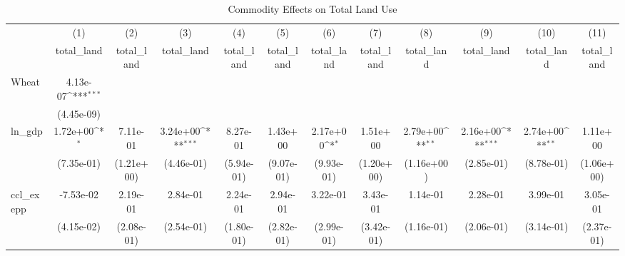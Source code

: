 \begin{table}[htbp]\centering
\def\sym#1{\ifmmode^{#1}\else\(^{#1}\)\fi}
\caption{Commodity Effects on Total Land Use}
\begin{tabular}{l*{11}{c}}
\hline\hline
            &\multicolumn{1}{c}{(1)}&\multicolumn{1}{c}{(2)}&\multicolumn{1}{c}{(3)}&\multicolumn{1}{c}{(4)}&\multicolumn{1}{c}{(5)}&\multicolumn{1}{c}{(6)}&\multicolumn{1}{c}{(7)}&\multicolumn{1}{c}{(8)}&\multicolumn{1}{c}{(9)}&\multicolumn{1}{c}{(10)}&\multicolumn{1}{c}{(11)}\\
            &\multicolumn{1}{c}{total\_land}&\multicolumn{1}{c}{total\_land}&\multicolumn{1}{c}{total\_land}&\multicolumn{1}{c}{total\_land}&\multicolumn{1}{c}{total\_land}&\multicolumn{1}{c}{total\_land}&\multicolumn{1}{c}{total\_land}&\multicolumn{1}{c}{total\_land}&\multicolumn{1}{c}{total\_land}&\multicolumn{1}{c}{total\_land}&\multicolumn{1}{c}{total\_land}\\
\hline
Wheat       &    4.13e-07\sym{***}&                     &                     &                     &                     &                     &                     &                     &                     &                     &                     \\
            &  (4.45e-09)         &                     &                     &                     &                     &                     &                     &                     &                     &                     &                     \\
[1em]
ln\_gdp      &    1.72e+00\sym{*}  &    7.11e-01         &    3.24e+00\sym{***}&    8.27e-01         &    1.43e+00         &    2.17e+00\sym{*}  &    1.51e+00         &    2.79e+00\sym{**} &    2.16e+00\sym{***}&    2.74e+00\sym{**} &    1.11e+00         \\
            &  (7.35e-01)         &  (1.21e+00)         &  (4.46e-01)         &  (5.94e-01)         &  (9.07e-01)         &  (9.93e-01)         &  (1.20e+00)         &  (1.16e+00)         &  (2.85e-01)         &  (8.78e-01)         &  (1.06e+00)         \\
[1em]
ccl\_exepp   &   -7.53e-02         &    2.19e-01         &    2.84e-01         &    2.24e-01         &    2.94e-01         &    3.22e-01         &    3.43e-01         &    1.14e-01         &    2.28e-01         &    3.99e-01         &    3.05e-01         \\
            &  (4.15e-02)         &  (2.08e-01)         &  (2.54e-01)         &  (1.80e-01)         &  (2.82e-01)         &  (2.99e-01)         &  (3.42e-01)         &  (1.16e-01)         &  (2.06e-01)         &  (3.14e-01)         &  (2.37e-01)         \\

\end{tabular}
\end{table}
